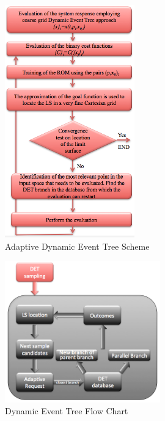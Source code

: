 \begin{figure}[h]
  \centering
     \includegraphics[width=0.5\textwidth]{figures/AdaptiveDET.png}
  \caption{Adaptive Dynamic Event Tree Scheme}
  \label{fig:AdaptiveDET}
\end{figure}
\begin{figure}[h]
  \centering
     \includegraphics[width=0.6\textwidth]{figures/adaptiveFlowChart.png}
  \caption{Dynamic Event Tree Flow Chart}
  \label{fig:ADETflowChart}
\end{figure}

